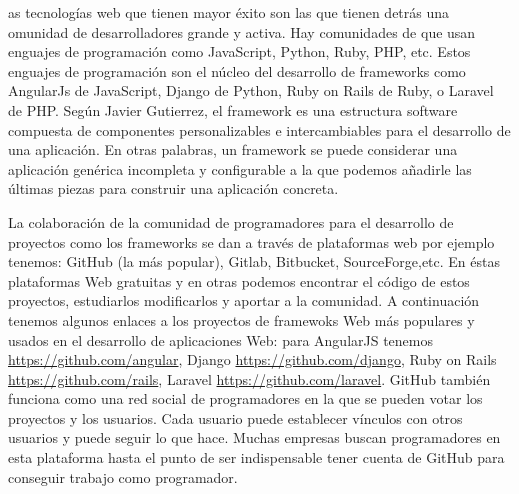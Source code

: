 \documentclass[twocolumns,a4paper]{IEEEtran}
\begin{document}
as tecnologías web que tienen mayor éxito son las que tienen detrás una
omunidad de desarrolladores grande y activa. Hay comunidades de que usan
enguajes de programación como JavaScript, Python, Ruby, PHP, etc. Estos
enguajes de programación son el núcleo del desarrollo de frameworks como
AngularJs de JavaScript, Django de Python, Ruby on Rails de Ruby, o Laravel de
PHP. Según Javier Gutierrez, el framework es una estructura software compuesta
de componentes personalizables e intercambiables para el desarrollo de una
aplicación. En otras palabras, un framework se puede considerar una aplicación
genérica incompleta y configurable a la que podemos añadirle las últimas piezas
para construir una aplicación concreta.\cite{GutierrezFramework}
\newline

La colaboración de la comunidad de programadores para el desarrollo de
proyectos como los frameworks se dan a través de plataformas web por ejemplo
tenemos: GitHub (la más popular), Gitlab, Bitbucket, SourceForge,etc. En éstas
plataformas Web gratuitas y en otras podemos encontrar el código de estos
proyectos, estudiarlos modificarlos y aportar a la comunidad. A continuación
tenemos algunos enlaces a los proyectos de framewoks Web más populares y usados
en el desarrollo de aplicaciones Web: para AngularJS tenemos
\url{https://github.com/angular}, Django \url{https://github.com/django}, Ruby
on Rails \url{https://github.com/rails}, Laravel
\url{https://github.com/laravel}. GitHub también funciona como una red social
de programadores en la que se pueden votar los proyectos y los usuarios. Cada
usuario puede establecer vínculos con otros usuarios y puede seguir lo que
hace. Muchas empresas buscan programadores en esta plataforma hasta el punto de
ser indispensable tener cuenta de GitHub para conseguir trabajo como
programador\cite{LuisGitHub2016}.
\newline
\end{document}

